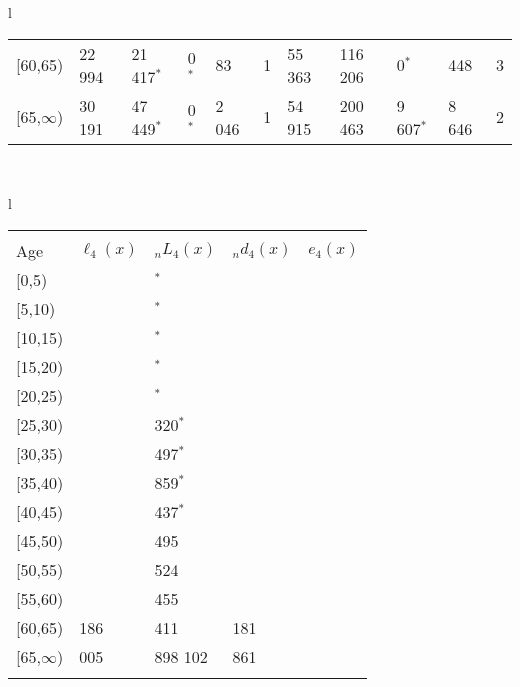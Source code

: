 \documentclass[
]{article}
\begin{document}
\begin{table}
\begin{tabular}[t]{l}
\begin{tabular}
{}[60,65) & 22 994 & 21 417$^{*}$ & 0$^{*}$ & 83 & 1 & 55 363 & 116 206 & 0$^{*}$ & 448 & 3\\
{}[65,$\infty$) & 30 191 & 47 449$^{*}$ & 0$^{*}$ & 2 046 & 1 & 54 915 & 200 463 & 9 607$^{*}$ & 8 646 & 2\\
\end{tabular}\\
\end{tabular}
\centering
\begin{tabular}[t]{l}
\hline
\begin{tabular}{>{\raggedright\arraybackslash}p{.43in}>{\raggedleft\arraybackslash}p{1.3in}>{\raggedleft\arraybackslash}p{1.3in}>{\raggedleft\arraybackslash}p{1.3in}>{\raggedleft\arraybackslash}p{1.3in}}
\toprule
\multicolumn{1}{c}{ } & \multicolumn{4}{c}{(4) Lost both} \\
\cmidrule(l{3pt}r{3pt}){2-5}
Age & $\ell_{4}(x)$ & ${}_nL_{4}(x)$ & ${}_nd_{4}(x)$ & $e_{4}(x)$\\
\midrule
{}[0,5) & 0 & 0$^{*}$ & 0 & 25\\
{}[5,10) & 0 & 0$^{*}$ & 0 & 25\\
{}[10,15) & 0 & 0$^{*}$ & 0 & 25\\
{}[15,20) & 0 & 0$^{*}$ & 0 & 25\\
{}[20,25) & 0 & 0$^{*}$ & 0 & 26\\
\addlinespace
{}[25,30) & 0 & 3 320$^{*}$ & 1 & 26\\
{}[30,35) & -1 & 1 497$^{*}$ & 0 & 26\\
{}[35,40) & -1 & 12 859$^{*}$ & 5 & 26\\
{}[40,45) & -7 & 8 437$^{*}$ & 5 & 26\\
{}[45,50) & -12 & 53 495 & 56 & 25\\
\addlinespace
{}[50,55) & -68 & 94 524 & 159 & 25\\
{}[55,60) & -227 & 160 455 & 392 & 24\\
{}[60,65) & 4 186 & 306 411 & 1 181 & 23\\
{}[65,$\infty$) & 3 005 & 1 898 102 & 81 861 & 20\\
\bottomrule
\multicolumn{5}{l}{\rule{0pt}{1em}\textsuperscript{*} Based on an estimated from SIPP with less than 10 respondents in the numerator.}\\
\end{tabular}\\
\end{tabular}
\end{table}
\end{document}
